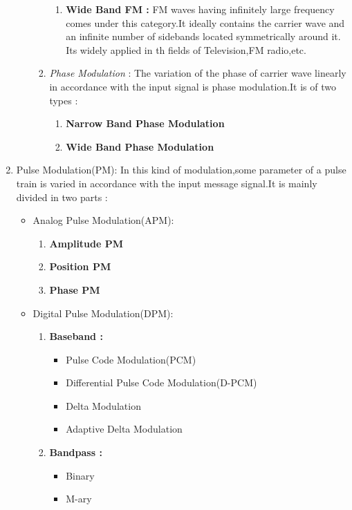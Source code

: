\documentclass[12pt,a4paper]{article}%
\begin{document}
\begin{flushleft}
\begin{flushleft}
\begin{enumerate}
\begin{itemize}
\begin{enumerate}
\begin{enumerate}
							\item \textbf{Wide Band FM : }FM waves having infinitely large frequency comes under this category.It ideally contains the carrier wave and an infinite number of sidebands located symmetrically around it.\\\smallskip
							Its widely applied in th fields of Television,FM radio,etc.
						\end{enumerate}
						\item \textit{Phase Modulation }: The variation of the phase of carrier wave linearly in accordance with the input signal is phase modulation.It is of two types :
						\begin{enumerate}
							\item \textbf{Narrow Band Phase Modulation }
							\item \textbf{Wide Band Phase Modulation }
						\end{enumerate}		        		
					\end{enumerate}
				\end{itemize}
				\item  {\large Pulse Modulation(PM): }In this kind of modulation,some parameter of a pulse train is varied in accordance with the input message signal.It is mainly divided in two parts :
				\begin{itemize}
					\item {\fontsize{14pt}{20pt}\selectfont Analog Pulse Modulation(APM): }
					\begin{enumerate}
						\item \textbf{Amplitude PM  }
						
						\item \textbf{Position PM  }
						
						\item \textbf{Phase PM  }
					\end{enumerate}
					
					\item {\fontsize{14pt}{20pt}\selectfont Digital Pulse Modulation(DPM): }
					\begin{enumerate}
						\item \textbf{Baseband : }
						\begin{itemize}
							\item Pulse Code Modulation(PCM)
							\item Differential Pulse Code Modulation(D-PCM)
							\item Delta Modulation
							\item Adaptive Delta Modulation
						\end{itemize}
						\item \textbf{Bandpass : }
						\begin{itemize}
							\item Binary
							\item M-ary
						\end{itemize}
					\end{enumerate}
				\end{itemize}
			\end{enumerate}
		\end{flushleft}
	\end{flushleft}
\end{document}
